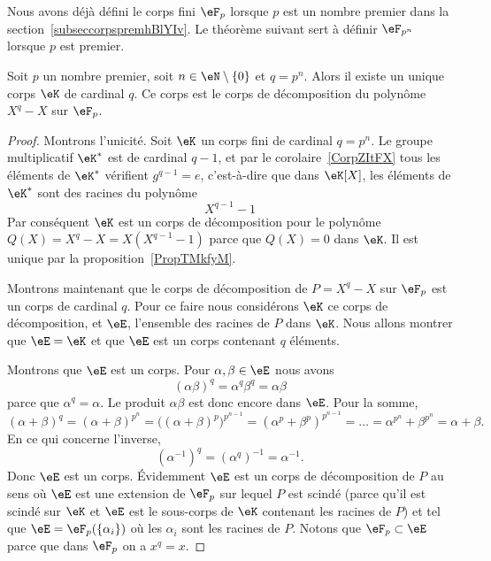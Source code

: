 Nous avons déjà défini le corps fini \( \eF_p\) lorsque \( p\) est un nombre premier dans la section~\ref{subseccorpspremhBlYIv}. Le théorème suivant sert à définir \( \eF_{p^n}\) lorsque \( p\) est premier.
\begin{theorem}     \label{ThoOzgSfy}
	Soit \( p\) un nombre premier, soit \( n\in \eN\setminus\{ 0 \}\) et \( q=p^n\). Alors il existe un unique corps \( \eK\) de cardinal \( q\). Ce corps est le corps de décomposition du polynôme \( X^q-X\) sur \( \eF_p\).
\end{theorem}

\begin{proof}
	Montrons l'unicité. Soit \( \eK\) un corps fini de cardinal \( q=p^n\). Le groupe multiplicatif \( \eK^*\) est de cardinal \( q-1\), et par le corolaire~\ref{CorpZItFX} tous les éléments de \( \eK^*\) vérifient \( g^{q-1}=e\), c'est-à-dire que dans \( \eK[X]\), les éléments de \( \eK^*\) sont des racines du polynôme
	\begin{equation}
		X^{q-1}-1
	\end{equation}
	Par conséquent \( \eK\) est un corps de décomposition pour le polynôme \( Q(X)=X^q-X=X(X^{q-1}-1)\) parce que \( Q(X)=0\) dans \( \eK\). Il est unique par la proposition~\ref{PropTMkfyM}.

	Montrons maintenant que le corps de décomposition de \( P=X^q-X\) sur \( \eF_p\) est un corps de cardinal \( q\). Pour ce faire nous considérons \( \eK\) ce corps de décomposition, et \(\eE\), l'ensemble des racines de \( P\) dans \( \eK\). Nous allons montrer que \( \eE=\eK\) et que \( \eE\) est un corps contenant \( q\) éléments.

	Montrons que \( \eE\) est un corps. Pour \( \alpha,\beta\in \eE\) nous avons
	\begin{equation}
		(\alpha\beta)^q=\alpha^q\beta^q=\alpha\beta
	\end{equation}
	parce que \( \alpha^q=\alpha\). Le produit \( \alpha\beta\) est donc encore dans \( \eE\). Pour la somme,
	\begin{equation}
		(\alpha+\beta)^q=(\alpha+\beta)^{p^n}=\Big( (\alpha+\beta)^p \Big)^{p^{n-1}}=(\alpha^p+\beta^p)^{p^{n-1}}=\ldots=\alpha^{p^n}+\beta^{p^n}=\alpha+\beta.
	\end{equation}
	En ce qui concerne l'inverse,
	\begin{equation}
		(\alpha^{-1})^q=(\alpha^q)^{-1}=\alpha^{-1}.
	\end{equation}
	Donc \( \eE\) est un corps. Évidemment \( \eE\) est un corps de décomposition de \( P\) au sens où \( \eE\) est une extension de \( \eF_p\) sur lequel \( P\) est scindé (parce qu'il est scindé sur \( \eK\) et \( \eE\) est le sous-corps de \( \eK\) contenant les racines de \( P\)) et tel que \( \eE=\eF_p(\{ \alpha_i \})\) où les \( \alpha_i\) sont les racines de \( P\). Notons que \( \eF_p\subset \eE\) parce que dans \( \eF_p\) on a \( x^q=x\).


\end{proof}
